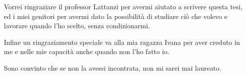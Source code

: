 \documentclass[a4paper,singleside,11pt]{report}
\begin{document}

\copertinatesi
{}
\indice
\indicefigure
\iniziatesto





%

\appendix
%


\ringraziamenti
Vorrei ringraziare il professor Lattanzi per avermi aiutato a scrivere questa tesi, ed i miei genitori per avermi dato la possibilit\`a di studiare ci\`o che volevo e lavorare quando l'ho scelto, senza condizionarmi.

Infine un ringraziamento speciale va alla mia ragazza Ivana per aver creduto in me e nelle mie capacit\`a anche quando non l'ho fatto io.

Sono convinto che se non la avessi incontrata, non mi sarei mai laureato.
\end{document}

